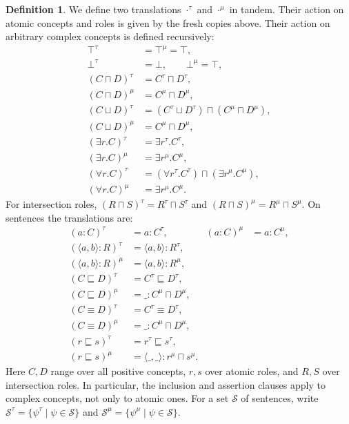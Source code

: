 \documentclass[letterpaper]{article} %
\theoremstyle{definition}
\theoremstyle{definition}
\newtheorem{definition}{Definition}
\theoremstyle{definition}
\theoremstyle{definition}
\theoremstyle{definition}
\begin{document}
\begin{definition}\label{def:tau-mu}
We define two translations $\cdot^{\tau}$ and $\cdot^{\mu}$ in tandem. Their action on atomic concepts and roles is given by the fresh copies above. Their action on arbitrary complex concepts is defined recursively:
\begin{align*}
\top^{\tau}&=\top^{\mu}=\top,\\
\bot^{\tau}&=\bot,\qquad \bot^{\mu}=\top,\\
(C\sqcap D)^{\tau}&=C^{\tau}\sqcap D^{\tau},\\
(C\sqcap D)^{\mu}&=C^{\mu}\sqcap D^{\mu},\\
(C\sqcup D)^{\tau}&=(C^{\tau}\sqcup D^{\tau})\sqcap(C^{\mu}\sqcap D^{\mu}),\\
(C\sqcup D)^{\mu}&=C^{\mu}\sqcap D^{\mu},\\
(\exists r.C)^{\tau}&=\exists r^{\tau}.C^{\tau},\\
(\exists r.C)^{\mu}&=\exists r^{\mu}.C^{\mu},\\
(\forall r.C)^{\tau}&=(\forall r^{\tau}.C^{\tau})\sqcap(\exists r^{\mu}.C^{\mu}),\\
(\forall r.C)^{\mu}&=\exists r^{\mu}.C^{\mu}.
\end{align*}
For intersection roles, $(R\sqcap S)^{\tau}=R^{\tau}\sqcap S^{\tau}$ and $(R\sqcap S)^{\mu}=R^{\mu}\sqcap S^{\mu}$. On sentences the translations are:
\begin{align*}
(a:C)^{\tau}&=a:C^{\tau}, & (a:C)^{\mu}&=a:C^{\mu},\\
(\langle a,b\rangle:R)^{\tau}&=\langle a,b\rangle:R^{\tau},\\
(\langle a,b\rangle:R)^{\mu}&=\langle a,b\rangle:R^{\mu},\\
(C\sqsubseteq D)^{\tau}&=C^{\tau}\sqsubseteq D^{\tau},\\
(C\sqsubseteq D)^{\mu}&=\_:C^{\mu}\sqcap D^{\mu},\\
(C\equiv D)^{\tau}&=C^{\tau}\equiv D^{\tau},\\
(C\equiv D)^{\mu}&=\_:C^{\mu}\sqcap D^{\mu},\\
(r\sqsubseteq s)^{\tau}&=r^{\tau}\sqsubseteq s^{\tau},\\
(r\sqsubseteq s)^{\mu}&=\langle\_,\_\rangle:r^{\mu}\sqcap s^{\mu}.
\end{align*}
Here $C,D$ range over all positive concepts, $r,s$ over atomic roles, and $R,S$ over intersection roles. In particular, the inclusion and assertion clauses apply to complex concepts, not only to atomic ones. For a set $\mathcal{S}$ of sentences, write $\mathcal{S}^{\tau}=\{\psi^{\tau}\mid\psi\in\mathcal{S}\}$ and $\mathcal{S}^{\mu}=\{\psi^{\mu}\mid\psi\in\mathcal{S}\}$.
\end{definition}
\end{document}
